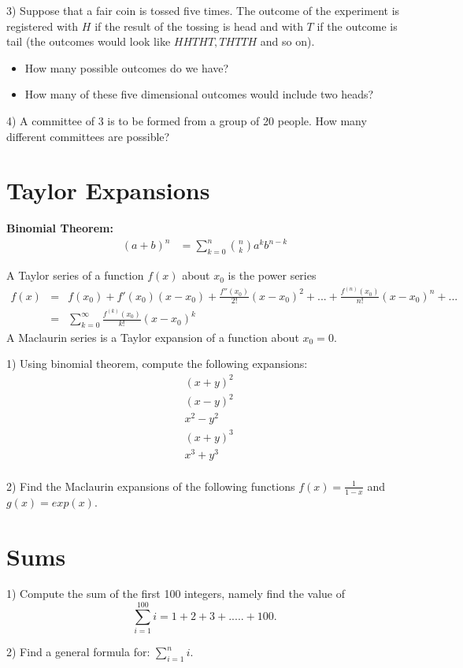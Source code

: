 \documentclass[12pt,a4paper,titlepage]{article}\usepackage[]{graphicx}\usepackage[]{color}
\begin{document}
3) Suppose that a fair coin is tossed five times. The outcome of the experiment is registered with $ H $ if the result of the tossing is head and with $ T $ if the outcome is tail (the outcomes would look like $ HHTHT, THTTH $ and so on).
\begin{itemize}
  \item How many possible outcomes do we have?
  \item How many of these five dimensional outcomes would include two heads?
\end{itemize}

4) A committee of 3 is to be formed from a group of 20 people. How many different committees are possible?

\vspace{1cm}



\section{Taylor Expansions}


\textbf{Binomial Theorem:}
\begin{align}
(a+b)^{n}&=\sum_{k=0}^{n}{n \choose k} a^{k} b^{n-k}
\end{align}

A Taylor series of a function $ f(x) $ about $ x_0 $ is the power series
\begin{eqnarray}
f(x)&=&f(x_0)+f'(x_0)(x-x_0)+\frac{f''(x_0)}{2!}(x-x_0)^{2}+...+\frac{f^{(n)}(x_0)}{n!}(x-x_0)^{n}+... \\
&=& \sum_{k=0}^\infty \frac{f^{(k)}(x_0)}{k!}(x-x_0)^{k}
\end{eqnarray}
A Maclaurin series is a Taylor expansion of a function about $ x_0=0 $.\newline

1) Using binomial theorem, compute the following expansions:
\begin{align*}
 &(x+y)^{2}  \\
 &(x-y)^{2}\\
 &x^{2}-y^{2}\\
 &(x+y)^{3} \\
 &x^{3}+y^{3}\\
\end{align*}

2) Find the Maclaurin expansions of the following functions
$ f(x)=\frac{1}{1-x} $ and $ g(x)=exp(x)$.


\vspace{1cm}



\section{Sums}

1) Compute the sum of the first 100 integers, namely find the value of
$$
\sum_{i=1}^{100} i =1 +2 + 3+ .....+100.
$$

2) Find a general formula for: $\sum_{i=1}^n i$.
\end{document}
